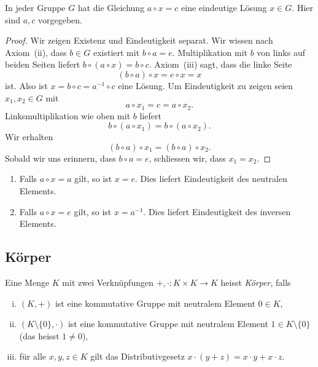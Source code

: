 \documentclass[../main.tex]{subfiles}
\begin{document}
\begin{manualproposition}{3}
  In jeder Gruppe $G$
  hat die Gleichung $a \circ x = c$
  eine eindeutige Lösung $x \in G$. Hier sind $a,c$ vorgegeben.
\end{manualproposition}

\begin{proof}
  Wir zeigen Existenz und Eindeutigkeit separat. Wir wissen nach
  Axiom~(ii), dass $b \in G$ existiert mit $b \circ a = e$.
  Multiplikation mit $b$ von links auf beiden Seiten liefert
  $b \circ (a \circ x) = b \circ c$. Axiom~(iii) sagt, dass
  die linke Seite
  \[
    (b \circ a) \circ x = e \circ x = x
  \]
  ist. Also ist $x = b \circ c = a^{-1} \circ c$ eine Lösung.
  Um Eindeutigkeit zu zeigen seien $x_{1}, x_{2} \in G$ mit
  \[
    a \circ x_{1} = c = a \circ x_{2}.
  \]
  Linksmultiplikation wie oben mit $b$ liefert
  \[b \circ (a \circ x_{1}) = b \circ (a \circ x_{2}).\]
  Wir erhalten
  \[
    (b \circ a) \circ x_{1} = (b \circ a) \circ x_{2}.
  \]
  Sobald wir uns erinnern, dass $b \circ a = e$, schliessen wir,
  dass $x_{1} = x_{2}$.
\end{proof}

\begin{specialcases}
  \leavevmode
  \begin{enumerate}[(1)]
    \item Falls $a \circ x = a$ gilt, so ist $x = e$. Dies liefert Eindeutigkeit
      des neutralen Elements.
    \item Falls $a \circ x = e$ gilt, so ist $x = a^{-1}$. Dies liefert
      Eindeutigkeit des inversen Elements.
  \end{enumerate}
\end{specialcases}

\subsection*{Körper}
\begin{definition}
  Eine Menge $K$ mit zwei Verknüpfungen $+, \cdot \colon K \times K \to K$ heisst
  \emph{Körper}, falls
  \begin{enumerate}[(i)]
    \item $(K, +)$ ist eine kommutative Gruppe mit neutralem
      Element $0 \in K$,
    \item $(K \setminus \{0\}, \cdot)$ ist eine kommutative Gruppe
      mit neutralem Element $1 \in K \setminus \{0\}$ (das heisst $1 \neq 0$),
    \item für alle $x,y,z \in K$ gilt das
      Distributivgesetz $x \cdot (y + z) = x \cdot y + x \cdot z$.
  \end{enumerate}
\end{definition}
\end{document}
